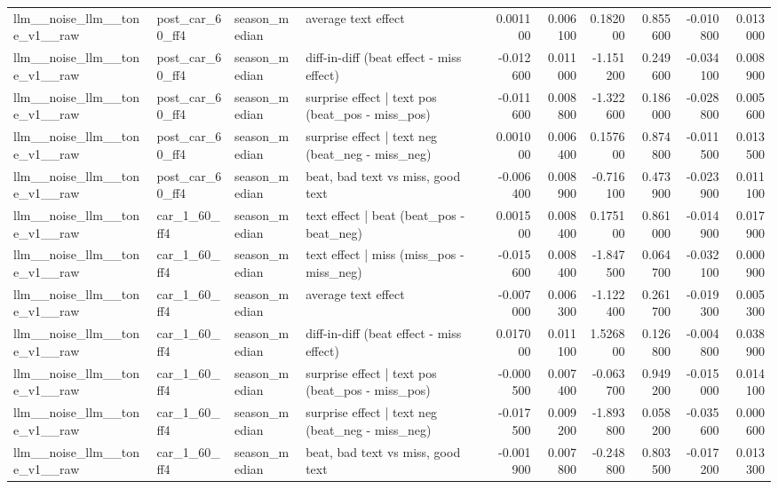 \begin{table}
\begin{tabular}{llllrrrrrr}
llm\_\_noise\_llm\_\_tone\_v1\_\_raw & post\_car\_60\_ff4 & season\_median & average text effect & 0.001100 & 0.006100 & 0.182000 & 0.855600 & -0.010800 & 0.013000 \\
llm\_\_noise\_llm\_\_tone\_v1\_\_raw & post\_car\_60\_ff4 & season\_median & diff-in-diff (beat effect - miss effect) & -0.012600 & 0.011000 & -1.151200 & 0.249600 & -0.034100 & 0.008900 \\
llm\_\_noise\_llm\_\_tone\_v1\_\_raw & post\_car\_60\_ff4 & season\_median & surprise effect | text pos (beat\_pos - miss\_pos) & -0.011600 & 0.008800 & -1.322600 & 0.186000 & -0.028800 & 0.005600 \\
llm\_\_noise\_llm\_\_tone\_v1\_\_raw & post\_car\_60\_ff4 & season\_median & surprise effect | text neg (beat\_neg - miss\_neg) & 0.001000 & 0.006400 & 0.157600 & 0.874800 & -0.011500 & 0.013500 \\
llm\_\_noise\_llm\_\_tone\_v1\_\_raw & post\_car\_60\_ff4 & season\_median & beat, bad text vs miss, good text & -0.006400 & 0.008900 & -0.716100 & 0.473900 & -0.023900 & 0.011100 \\
llm\_\_noise\_llm\_\_tone\_v1\_\_raw & car\_1\_60\_ff4 & season\_median & text effect | beat  (beat\_pos - beat\_neg) & 0.001500 & 0.008400 & 0.175100 & 0.861000 & -0.014900 & 0.017900 \\
llm\_\_noise\_llm\_\_tone\_v1\_\_raw & car\_1\_60\_ff4 & season\_median & text effect | miss  (miss\_pos - miss\_neg) & -0.015600 & 0.008400 & -1.847500 & 0.064700 & -0.032100 & 0.000900 \\
llm\_\_noise\_llm\_\_tone\_v1\_\_raw & car\_1\_60\_ff4 & season\_median & average text effect & -0.007000 & 0.006300 & -1.122400 & 0.261700 & -0.019300 & 0.005300 \\
llm\_\_noise\_llm\_\_tone\_v1\_\_raw & car\_1\_60\_ff4 & season\_median & diff-in-diff (beat effect - miss effect) & 0.017000 & 0.011100 & 1.526800 & 0.126800 & -0.004800 & 0.038900 \\
llm\_\_noise\_llm\_\_tone\_v1\_\_raw & car\_1\_60\_ff4 & season\_median & surprise effect | text pos (beat\_pos - miss\_pos) & -0.000500 & 0.007400 & -0.063700 & 0.949200 & -0.015000 & 0.014100 \\
llm\_\_noise\_llm\_\_tone\_v1\_\_raw & car\_1\_60\_ff4 & season\_median & surprise effect | text neg (beat\_neg - miss\_neg) & -0.017500 & 0.009200 & -1.893800 & 0.058200 & -0.035600 & 0.000600 \\
llm\_\_noise\_llm\_\_tone\_v1\_\_raw & car\_1\_60\_ff4 & season\_median & beat, bad text vs miss, good text & -0.001900 & 0.007800 & -0.248800 & 0.803500 & -0.017200 & 0.013300 \\

\end{tabular}
\end{table}
